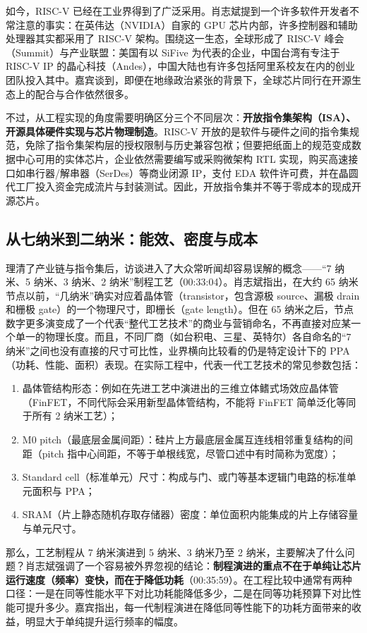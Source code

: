 \documentclass[UTF8,a4paper,11pt,fontset=fandol]{ctexart}
\begin{document}
如今，RISC-V 已经在工业界得到了广泛采用。肖志斌提到一个许多软件开发者不常注意的事实：在英伟达（NVIDIA）自家的 GPU 芯片内部，许多控制器和辅助处理器其实都采用了 RISC-V 架构。围绕这一生态，全球形成了 RISC-V 峰会（Summit）与产业联盟：美国有以 SiFive 为代表的企业，中国台湾有专注于 RISC-V IP 的晶心科技（Andes），中国大陆也有许多包括阿里系校友在内的创业团队投入其中。嘉宾谈到，即便在地缘政治紧张的背景下，全球芯片同行在开源生态上的配合与合作依然很多。

不过，从工程实现的角度需要明确区分三个不同层次：\textbf{开放指令集架构（ISA）、开源具体硬件实现与芯片物理制造}。RISC-V 开放的是软件与硬件之间的指令集规范，免除了指令集架构层的授权限制与历史兼容包袱；但要把纸面上的规范变成数据中心可用的实体芯片，企业依然需要编写或采购微架构 RTL 实现，购买高速接口如串行器/解串器（SerDes）等商业闭源 IP，支付 EDA 软件许可费，并在晶圆代工厂投入资金完成流片与封装测试。因此，开放指令集并不等于零成本的现成开源芯片。

\subsection{从七纳米到二纳米：能效、密度与成本}
理清了产业链与指令集后，访谈进入了大众常听闻却容易误解的概念——“7 纳米、5 纳米、3 纳米、2 纳米”制程工艺（00:33:04）。肖志斌指出，在大约 65 纳米节点以前，“几纳米”确实对应着晶体管（transistor，包含源极 source、漏极 drain 和栅极 gate）的一个物理尺寸，即栅长（gate length）。但在 65 纳米之后，节点数字更多演变成了一个代表“整代工艺技术”的商业与营销命名，不再直接对应某一个单一的物理长度。而且，不同厂商（如台积电、三星、英特尔）各自命名的“7 纳米”之间也没有直接的尺寸可比性，业界横向比较看的仍是特定设计下的 PPA（功耗、性能、面积）表现。在实际工程中，代表一代工艺技术的常见参数包括：
\begin{enumerate}
\item 晶体管结构形态：例如在先进工艺中演进出的三维立体鳍式场效应晶体管（FinFET，不同代际会采用新型晶体管结构，不能将 FinFET 简单泛化等同于所有 2 纳米工艺）；
\item M0 pitch（最底层金属间距）：硅片上方最底层金属互连线相邻重复结构的间距（pitch 指中心间距，不等于单根线宽，尽管口述中有时简称为宽度）；
\item Standard cell（标准单元）尺寸：构成与门、或门等基本逻辑门电路的标准单元面积与 PPA；
\item SRAM（片上静态随机存取存储器）密度：单位面积内能集成的片上存储容量与单元尺寸。
\end{enumerate}

那么，工艺制程从 7 纳米演进到 5 纳米、3 纳米乃至 2 纳米，主要解决了什么问题？肖志斌强调了一个容易被外界忽视的结论：\textbf{制程演进的重点不在于单纯让芯片运行速度（频率）变快，而在于降低功耗}（00:35:59）。在工程比较中通常有两种口径：一是在同等性能水平下对比功耗能降低多少，二是在同等功耗预算下对比性能可提升多少。嘉宾指出，每一代制程演进在降低同等性能下的功耗方面带来的收益，明显大于单纯提升运行频率的幅度。
\end{document}
